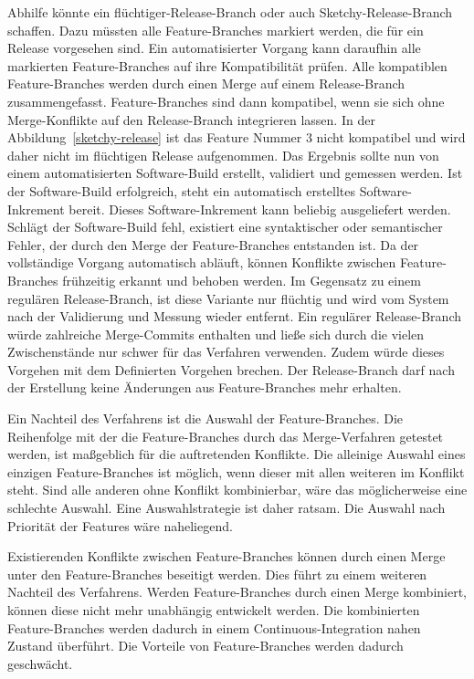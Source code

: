 Abhilfe könnte ein \glqq flüchtiger\grqq{}-Release-Branch oder auch \glqq Sketchy\grqq{}-Release-Branch schaffen. Dazu müssten alle Feature-Branches markiert werden, die für ein Release vorgesehen sind. Ein automatisierter Vorgang kann daraufhin alle markierten Feature-Branches auf ihre Kompatibilität prüfen. Alle kompatiblen Feature-Branches werden durch einen Merge auf einem Release-Branch zusammengefasst. Feature-Branches sind dann kompatibel, wenn sie sich ohne Merge-Konflikte auf den Release-Branch integrieren lassen. In der Abbildung~\ref{sketchy-release} ist das Feature Nummer 3 nicht kompatibel und wird daher nicht im flüchtigen Release aufgenommen. Das Ergebnis sollte nun von einem automatisierten Software-Build erstellt, validiert und gemessen werden. Ist der Software-Build erfolgreich, steht ein automatisch erstelltes Software-Inkrement bereit. Dieses Software-Inkrement kann beliebig ausgeliefert werden. Schlägt der Software-Build fehl, existiert eine syntaktischer oder semantischer Fehler, der durch den Merge der Feature-Branches entstanden ist. Da der vollständige Vorgang automatisch abläuft, können Konflikte zwischen Feature-Branches frühzeitig erkannt und behoben werden. Im Gegensatz zu einem regulären Release-Branch, ist diese Variante nur flüchtig und wird vom System nach der Validierung und Messung wieder entfernt. Ein regulärer Release-Branch würde zahlreiche Merge-Commits enthalten und ließe sich durch die vielen Zwischenstände nur schwer für das Verfahren verwenden. Zudem würde dieses Vorgehen mit dem Definierten Vorgehen brechen. Der Release-Branch darf nach der Erstellung keine Änderungen aus Feature-Branches mehr erhalten.

Ein Nachteil des Verfahrens ist die Auswahl der Feature-Branches. Die Reihenfolge mit der die Feature-Branches durch das Merge-Verfahren getestet werden, ist maßgeblich für die auftretenden Konflikte. Die alleinige Auswahl eines einzigen Feature-Branches ist möglich, wenn dieser mit allen weiteren im Konflikt steht. Sind alle anderen ohne Konflikt kombinierbar, wäre das möglicherweise eine schlechte Auswahl. Eine Auswahlstrategie ist daher ratsam. Die Auswahl nach Priorität der Features wäre naheliegend.

Existierenden Konflikte zwischen Feature-Branches können durch einen Merge unter den Feature-Branches beseitigt werden. Dies führt zu einem weiteren Nachteil des Verfahrens. Werden Feature-Branches durch einen Merge kombiniert, können diese nicht mehr unabhängig entwickelt werden. Die kombinierten Feature-Branches werden dadurch in einem Continuous-Integration nahen Zustand überführt. Die Vorteile von Feature-Branches werden dadurch geschwächt.

